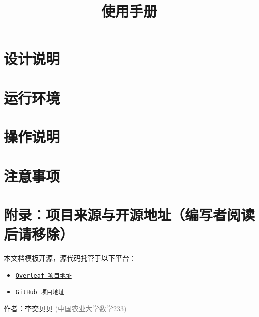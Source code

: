 \documentclass{Manual}  %
\title{\bf{使用手册}}
\author{\bf{\Name}}
\date{\version}
\begin{document}
\maketitle
\tableofcontents
\newpage

\section{设计说明}

\section{运行环境}

\section{操作说明}

\section{注意事项}


\newpage
\section*{附录：项目来源与开源地址（编写者阅读后请移除）}
本文档模板开源，源代码托管于以下平台：

\begin{itemize}
    \item \href{https://cn.overleaf.com/read/fcvcbxycqkrt\#067a4d}{\texttt{Overleaf 项目地址}}
    \item \href{https://github.com/liyizenb/Softwar-Manual-Template}{\texttt{GitHub 项目地址}}
\end{itemize}

作者：李奕贝贝 {\small \textcolor{gray}{(中国农业大学数学233)}}
\end{document}
